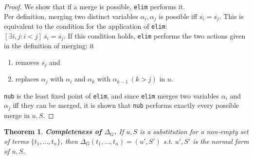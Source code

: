 \documentclass[a4paper, 11pt]{report}
\newtheorem{theorem}{Theorem}
\begin{document}
\begin{proof}
We show that if a merge is possible, \texttt{elim} performs it.\\

\noindent
Per definition, merging two distinct variables $\alpha_i, \alpha_j$ is possible iff $\overline{s_i} = \overline{s_j}$. This is equivalent to the condition for the application of \texttt{elim}:\\ $[\exists i,j: i < j]\ \overline{s_{i}} = \overline{s_{j}}$.
If this condition holds, \texttt{elim} performs the two actions given in the definition of merging: it
  \begin{enumerate}
    \item removes $\overline{s_j}$ and
    \item replaces $\alpha_j$ with $\alpha_i$ and $\alpha_k$ with $\alpha_{k-1}\ (k > j)$ in $u$.
  \end{enumerate}

\texttt{nub} is the least fixed point of \texttt{elim}, and since \texttt{elim} merges two variables $\alpha_i$ and $\alpha_j$ iff they can be merged, it is shown that \texttt{nub} performs exactly every possible merge in $u,S$.
\end{proof}

\begin{theorem}
  \textbf{Completeness of $\Delta_G$.}
  If $u,S$ is a substitution for a non-empty set of terms $\{t_1,\dots,t_n\}$, then $\Delta_G(t_1,\dots,t_n) = (u',S')$ s.t. $u',S'$ is the normal form of $u,S$.
  \label{thm:DeltaGCompleteness}
\end{theorem}
\end{document}
